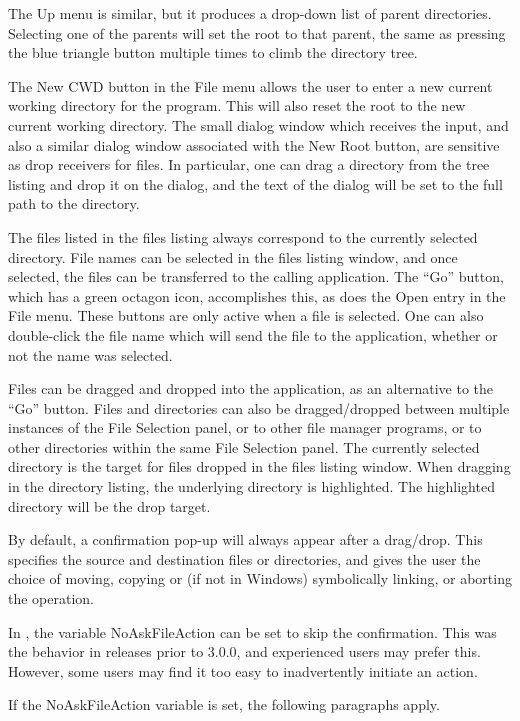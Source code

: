 The {\cb Up} menu is similar, but it produces a drop-down list of
parent directories.  Selecting one of the parents will set the root to
that parent, the same as pressing the blue triangle button multiple
times to climb the directory tree.

The {\cb New CWD} button in the {\cb File} menu allows the user to
enter a new current working directory for the program.  This will also
reset the root to the new current working directory.  The small dialog
window which receives the input, and also a similar dialog window
associated with the {\cb New Root} button, are sensitive as drop
receivers for files.  In particular, one can drag a directory from the
tree listing and drop it on the dialog, and the text of the dialog
will be set to the full path to the directory.

The files listed in the files listing always correspond to the
currently selected directory.  File names can be selected in the files
listing window, and once selected, the files can be transferred to the
calling application.  The ``Go'' button, which has a green octagon
icon, accomplishes this, as does the {\cb Open} entry in the {\cb
File} menu.  These buttons are only active when a file is selected. 
One can also double-click the file name which will send the file to
the application, whether or not the name was selected.

Files can be dragged and dropped into the application, as an
alternative to the ``Go'' button.  Files and directories can also be
dragged/dropped between multiple instances of the {\cb File Selection}
panel, or to other file manager programs, or to other directories
within the same {\cb File Selection} panel.  The currently selected
directory is the target for files dropped in the files listing window. 
When dragging in the directory listing, the underlying directory is
highlighted.  The highlighted directory will be the drop target.

By default, a confirmation pop-up will always appear after a
drag/drop.  This specifies the source and destination files or
directories, and gives the user the choice of moving, copying or (if
not in Windows) symbolically linking, or aborting the operation.

In {\Xic}, the variable {\et NoAskFileAction} can be set to skip the
confirmation.  This was the behavior in releases prior to 3.0.0, and
experienced users may prefer this.  However, some users may find it
too easy to inadvertently initiate an action.

If the {\et NoAskFileAction} variable is set, the following paragraphs
apply.


